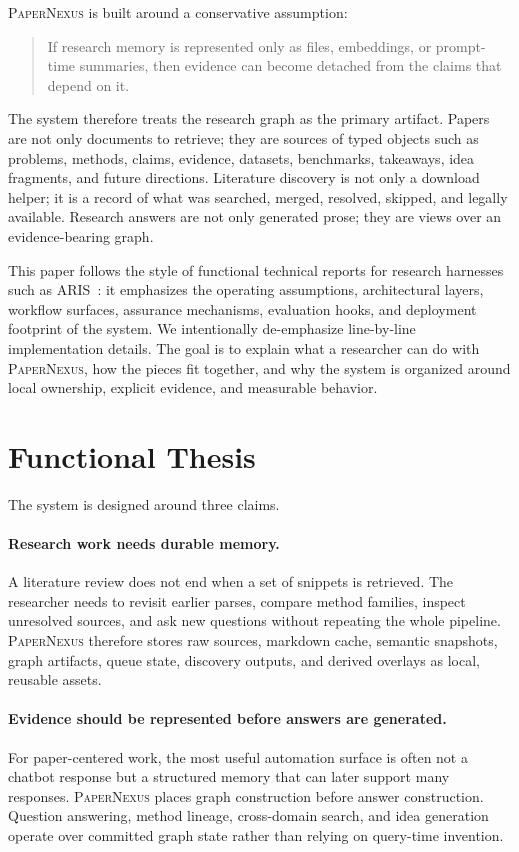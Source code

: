 \documentclass[11pt]{article}
\newcommand{\papernexus}{\textsc{PaperNexus}}
\begin{document}
\papernexus{} is built around a conservative assumption:

\begin{quote}
If research memory is represented only as files, embeddings, or prompt-time summaries, then evidence can become detached from the claims that depend on it.
\end{quote}

The system therefore treats the research graph as the primary artifact. Papers are not only documents to retrieve; they are sources of typed objects such as problems, methods, claims, evidence, datasets, benchmarks, takeaways, idea fragments, and future directions. Literature discovery is not only a download helper; it is a record of what was searched, merged, resolved, skipped, and legally available. Research answers are not only generated prose; they are views over an evidence-bearing graph.

This paper follows the style of functional technical reports for research harnesses such as ARIS~\citep{yang2026aris}: it emphasizes the operating assumptions, architectural layers, workflow surfaces, assurance mechanisms, evaluation hooks, and deployment footprint of the system. We intentionally de-emphasize line-by-line implementation details. The goal is to explain what a researcher can do with \papernexus{}, how the pieces fit together, and why the system is organized around local ownership, explicit evidence, and measurable behavior.

\section{Functional Thesis}

The system is designed around three claims.

\paragraph{Research work needs durable memory.}
A literature review does not end when a set of snippets is retrieved. The researcher needs to revisit earlier parses, compare method families, inspect unresolved sources, and ask new questions without repeating the whole pipeline. \papernexus{} therefore stores raw sources, markdown cache, semantic snapshots, graph artifacts, queue state, discovery outputs, and derived overlays as local, reusable assets.

\paragraph{Evidence should be represented before answers are generated.}
For paper-centered work, the most useful automation surface is often not a chatbot response but a structured memory that can later support many responses. \papernexus{} places graph construction before answer construction. Question answering, method lineage, cross-domain search, and idea generation operate over committed graph state rather than relying on query-time invention.
\end{document}
